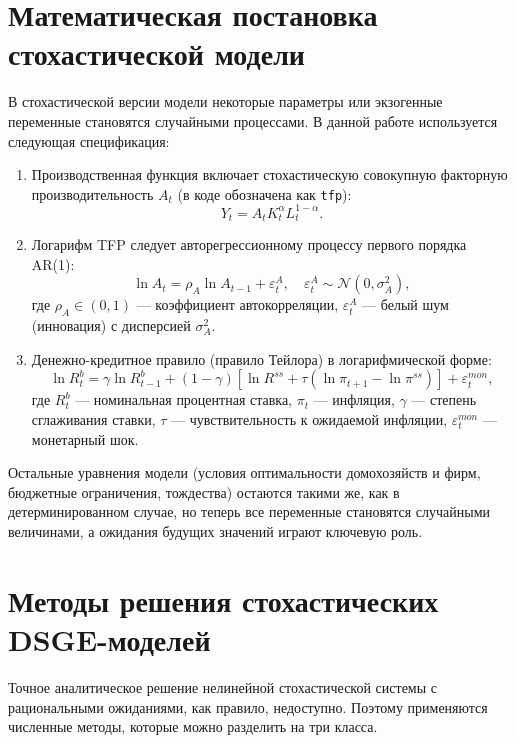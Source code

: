 \documentclass[12pt,a4paper]{report}   %
\begin{document}
        \section{Математическая постановка стохастической модели}

        В стохастической версии модели некоторые параметры или экзогенные переменные становятся случайными процессами. В данной работе используется следующая спецификация:

        \begin{enumerate}
            \item Производственная функция включает стохастическую совокупную факторную производительность $A_t$ (в коде обозначена как \texttt{tfp}):
            \[
            Y_t = A_t K_t^{\alpha} L_t^{1-\alpha}.
            \]
            
            \item Логарифм TFP следует авторегрессионному процессу первого порядка AR(1):
            \[
            \ln A_t = \rho_{A} \ln A_{t-1} + \varepsilon_t^{A}, \quad \varepsilon_t^{A} \sim \mathcal{N}(0, \sigma_A^2),
            \]
            где $\rho_A \in (0,1)$ — коэффициент автокорреляции, $\varepsilon_t^{A}$ — белый шум (инновация) с дисперсией $\sigma_A^2$.
            
            \item Денежно-кредитное правило (правило Тейлора) в логарифмической форме:
            \[
            \ln R_t^b = \gamma \ln R_{t-1}^b + (1-\gamma)\left[ \ln R^{ss} + \tau \left( \ln \pi_{t+1} - \ln \pi^{ss} \right) \right] + \varepsilon_t^{mon}, 
            \]
            где $R_t^b$ — номинальная процентная ставка, $\pi_t$ — инфляция, $\gamma$ — степень сглаживания ставки, $\tau$ — чувствительность к ожидаемой инфляции, $\varepsilon_t^{mon}$ — монетарный шок.
        \end{enumerate}

        Остальные уравнения модели (условия оптимальности домохозяйств и фирм, бюджетные ограничения, тождества) остаются такими же, как в детерминированном случае, но теперь все переменные становятся случайными величинами, а ожидания будущих значений играют ключевую роль.

        \section{Методы решения стохастических DSGE-моделей}

        Точное аналитическое решение нелинейной стохастической системы с рациональными ожиданиями, как правило, недоступно. Поэтому применяются численные методы, которые можно разделить на три класса.
\end{document}
